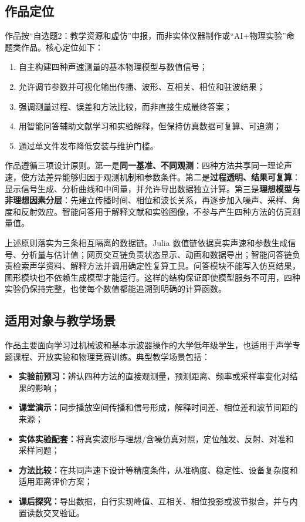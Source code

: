 \documentclass[UTF8,a4paper,zihao=-4]{ctexart}
\begin{document}
\subsection{作品定位}
作品按“自选题2：教学资源和虚仿”申报，而非实体仪器制作或“AI+物理实验”命题类作品。核心定位如下：
\begin{enumerate}
  \item 自主构建四种声速测量的基本物理模型与数值信号；
  \item 允许调节参数并可视化输出传播、波形、互相关、相位和驻波结果；
  \item 强调测量过程、误差和方法比较，而非直接生成最终答案；
  \item 用智能问答辅助文献学习和实验解释，但保持仿真数据可复算、可追溯；
  \item 通过单文件发布降低安装与维护门槛。
\end{enumerate}

作品遵循三项设计原则。第一是\textbf{同一基准、不同观测}：四种方法共享同一理论声速，使方法差异能够归因于观测机制和参数条件。第二是\textbf{过程透明、结果可复算}：显示信号生成、分析曲线和中间量，并允许导出数据独立计算。第三是\textbf{理想模型与非理想因素分层}：先建立传播时间、相位和波长关系，再逐步加入噪声、采样、角度和反射效应。智能问答用于解释文献和实验图像，不参与产生四种方法的仿真测量值。

上述原则落实为三条相互隔离的数据链。Julia 数值链依据真实声速和参数生成信号、分析量与估计值；网页交互链负责状态显示、动画和数据导出；智能问答链负责检索声学资料、解释方法并调用确定性复算工具。问答模块不能写入仿真结果，图形模块也不依赖生成模型才能运行。这样的结构保证即使模型服务不可用，四种实验仍保持完整，也使每个数值都能追溯到明确的计算函数。

\subsection{适用对象与教学场景}
作品主要面向学习过机械波和基本示波器操作的大学低年级学生，也适用于声学专题课程、开放实验和物理竞赛训练。典型教学场景包括：
\begin{itemize}
  \item \textbf{实验前预习：}辨认四种方法的直接观测量，预测距离、频率或采样率变化对结果的影响；
  \item \textbf{课堂演示：}同步播放空间传播和信号形成，解释时间差、相位差和波节间距的来源；
  \item \textbf{实体实验配套：}将真实波形与理想/含噪仿真对照，定位触发、反射、对准和采样问题；
  \item \textbf{方法比较：}在共同声速下设计等精度条件，从准确度、稳定性、设备复杂度和适用距离评价方案；
  \item \textbf{课后探究：}导出数据，自行实现峰值、互相关、相位投影或波节拟合，并与内置读数交叉验证。
\end{itemize}
\end{document}
